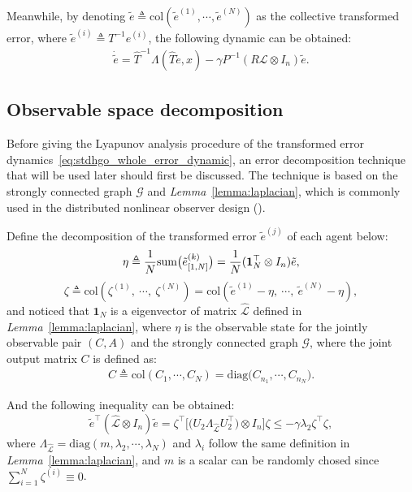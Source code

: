 \documentclass{ifacconf}
\begin{document}
Meanwhile, by denoting $\tilde{e} \triangleq \mathrm{col} (\tilde{e}^{(1)}, \cdots , \tilde{e}^{(N)})$ as the collective transformed error, where $\tilde{e}^{(i)}\triangleq T^{-1}e^{(i)}$, the following dynamic can be obtained:
\begin{equation}
    \begin{aligned}
        \dot{\tilde{e}}=\hat{T}^{-1}\Lambda(\hat{T}\tilde{e},x)-\gamma P^{-1}(R\mathcal{L}\otimes I_n)\tilde{e}.
    \end{aligned}\label{eq:stdhgo_whole_error_dynamic}
\end{equation}

\subsection{Observable space decomposition}
\vspace*{-0.3cm}
Before giving the Lyapunov analysis procedure of the transformed error dynamics~\eqref{eq:stdhgo_whole_error_dynamic}, an error decomposition technique that will be used later should first be discussed.
The technique is based on the strongly connected graph $\mathcal{G}$ and {\it Lemma}~\ref{lemma:laplacian}, which is commonly used in the distributed nonlinear observer design (\cite{han2018simple,wu2021design, yang2022state, meng2025distributed}).

Define the decomposition of the transformed error $\tilde{e}^{(j)}$ of each agent below:
\[\eta \triangleq \frac{1}{N}{\rm sum}\big(\tilde{e}^{(k)}_{[1,N]}\big)=\frac{1}{N}(\mathbf{1}_N^\top\otimes I_{n})\tilde{e},\]
\[ \zeta\triangleq\mathrm{col}(\zeta^{(1)},\ \cdots,\ \zeta^{(N)})=\mathrm{col}(\tilde{e}^{(1)}-\eta,\ \cdots,\ \tilde{e}^{(N)}-\eta),\]
and noticed that $\mathbf{1}_N$ is a eigenvector of matrix $\hat{\mathcal{L}}$ defined in {\it Lemma}~\ref{lemma:laplacian}, where $\eta$ is the observable state for the jointly observable pair $(C,A)$ and the strongly connected graph $\mathcal{G}$, where the joint output matrix $C$ is defined as:
\begin{equation}
    \begin{aligned}
        C\triangleq \mathrm{col} \left(C_{1}, \cdots , C_{N} \right)=\mathrm{diag}\big(C_{n_1},\cdots,C_{n_N }\big).
    \end{aligned}
\end{equation}

And the following inequality can be obtained:
\[\tilde{e}^\top(\hat{\mathcal{L}}\otimes I_n)\tilde{e}=\zeta^\top\Big[\big(U_2\Lambda_{\hat{\mathcal{L}}}U_2^\top\big)\otimes I_n\Big]\zeta\le-\gamma \lambda_2\zeta^\top\zeta, \]
where $\Lambda_{\hat{\mathcal{L}}}=\mathrm{diag}(m,\lambda_2,\cdots,\lambda_N)$ and $\lambda_i$ follow the same definition in {\it Lemma}~\ref{lemma:laplacian}, and $m$ is a scalar can be randomly chosed since $\sum^N_{i=1}\zeta^{(i)}\equiv0$.
\end{document}
